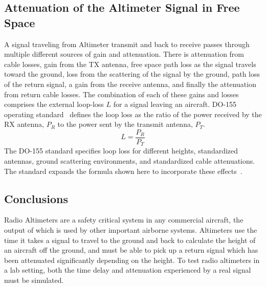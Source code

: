 \subsection{Attenuation of the Altimeter Signal in Free Space}
A signal traveling from Altimeter transmit and back to receive passes through multiple different sources of gain and attenuation. There is attenuation from cable losses, gain from the TX antenna, free space path loss as the signal travels toward the ground, loss from the scattering of the signal by the ground, path loss of the return signal, a gain from the receive antenna, and finally the attenuation from return cable losses. The combination of each of these gains and losses comprises the external loop-loss $L$ for a signal leaving an aircraft. DO-155 operating standard~\cite{noauthor_minimum_1974} defines the loop loss as the ratio of the power received by the RX antenna, $P_R$ to the power sent by the transmit antenna, $P_T$.
$$ L = \frac{P_R}{P_T}$$
The DO-155 standard specifies loop loss for different heights, standardized antennas,  ground scattering environments, and standardized cable attenuations. The standard expands the formula shown here to incorporate these effects~\cite{noauthor_minimum_1974}.
\subsection{Conclusions}
Radio Altimeters are a safety critical system in any commercial aircraft, the output of which is used by other important airborne systems. Altimeters use the time it takes a signal to travel to the ground and back to calculate the height of an aircraft off the ground, and must be able to pick up a return signal which has been attenuated significantly depending on the height. To test radio altimeters in a lab setting, both the time delay and attenuation experienced by a real signal must be simulated. 
